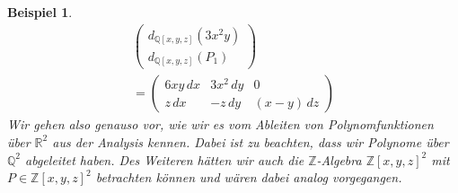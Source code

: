 \documentclass[10pt,a4paper]{report}
\newcounter{Aussage}[chapter]
\newtheorem{bsp}[Aussage]{Beispiel}
\newcommand{\divf}[1]{d_{#1}}
\begin{document}
\begin{bsp}
\begin{gather*}
\begin{pmatrix}
\divf{\mathbb{Q}[x,y,z]}(3x^2y) \\
\divf{\mathbb{Q}[x,y,z]}(P_1)
\end{pmatrix}\\
=
\begin{pmatrix}
6xy \, dx  &  3x^2 \, dy  &  0\\
z \,   dx  &  -z   \, dy  & (x - y) \, dz
\end{pmatrix}
\end{gather*}
Wir gehen also genauso vor, wie wir es vom Ableiten von Polynomfunktionen über $\mathbb{R}^2$ aus der Analysis kennen. Dabei ist zu beachten, dass wir Polynome über $\mathbb{Q}^2$ abgeleitet haben. Des Weiteren hätten wir auch die $\mathbb{Z}$-Algebra $\mathbb{Z}[x,y,z]^2$ mit $P \in \mathbb{Z}[x,y,z]^2$ betrachten können und wären dabei analog vorgegangen.
\end{bsp}
\end{document}
